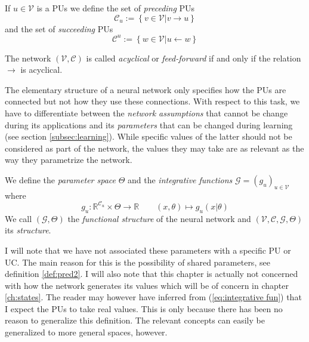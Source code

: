 \documentclass[a4paper,11pt]{article}
\begin{document}
\begin{Not}
If $u\in\mathcal{V}$ is a PUs we define the set of \emph{preceding} PUs
\begin{equation}
\mathcal{C}_u:=\left\{v\in\mathcal{V}|v\to u\right\}
\end{equation}
and the set of \emph{succeeding} PUs
\begin{equation}
\mathcal{C}^u:=\left\{w\in\mathcal{V}|u\leftarrow w\right\}
\end{equation}
\end{Not}
\begin{Def}
The network $(\mathcal{V},\mathcal{C})$ is called \emph{acyclical} or \emph{feed-forward} if and only if the relation $\to$ is acyclical.
\end{Def}
\begin{Abs}
The elementary structure of a neural network only specifies how the PUs are connected but not how they use these connections. With respect to this task, we have to differentiate between the \emph{network assumptions} that cannot be change during its applications and its \emph{parameters} that can be changed during learning (see section \ref{subsec:learning}). While specific values of the latter should not be considered as part of the network, the values they may take are as relevant as the way they parametrize the network.
\end{Abs}
\begin{Def}\label{def:integrate}
We define the \emph{parameter space} $\Theta$ and the \emph{integrative functions} $\mathcal{G}=\left(g_u\right)_{u\in\mathcal{V}}$ where 
\begin{equation}\label{eq:integrative fun}
g_u:\mathbb{R}^{\mathcal{C}_u}\times\Theta\to\mathbb{R}\qquad (x,\theta)\mapsto g_u(x|\theta)
\end{equation}
We call $(\mathcal{G},\Theta)$ the \emph{functional structure} of the neural network and $(\mathcal{V},\mathcal{C},\mathcal{G},\Theta)$ its \emph{structure}.
\end{Def}
\begin{Abs}
I will note that we have not associated these parameters with a specific PU or UC. The main reason for this is the possibility of shared parameters, see definition \ref{def:pred2}. I will also note that this chapter is actually not concerned with how the network generates its values which will be of concern in chapter \ref{ch:states}. The reader may however have inferred from (\ref{eq:integrative fun}) that I expect the PUs to take real values. This is only because there has been no reason to generalize this definition. The relevant concepts can easily be generalized to more general spaces, however.
\end{Abs}
\end{document}
